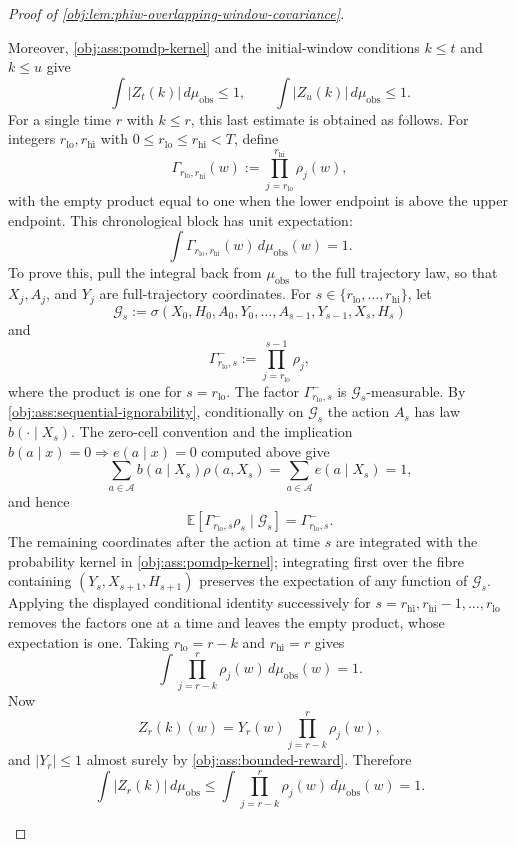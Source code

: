\documentclass[11pt]{article}
\begin{document}
\begin{proof}[Proof of \cref{obj:lem:phiw-overlapping-window-covariance}]
\begin{enumerate}
Moreover, \cref{obj:ass:pomdp-kernel} and the initial-window conditions \(k\le t\) and \(k\le u\) give
\[
\int |Z_t(k)|\,d\mu_{\mathrm{obs}}\le 1,
\qquad
\int |Z_u(k)|\,d\mu_{\mathrm{obs}}\le 1 .
\]
For a single time \(r\) with \(k\le r\), this last estimate is obtained as follows. For integers \(r_{\mathrm{lo}},r_{\mathrm{hi}}\) with \(0\le r_{\mathrm{lo}}\le r_{\mathrm{hi}}<T\), define
\[
\Gamma_{r_{\mathrm{lo}},r_{\mathrm{hi}}}(w)
:=
\prod_{j=r_{\mathrm{lo}}}^{r_{\mathrm{hi}}}\rho_j(w),
\]
with the empty product equal to one when the lower endpoint is above the upper endpoint. This chronological block has unit expectation:
\[
\int \Gamma_{r_{\mathrm{lo}},r_{\mathrm{hi}}}(w)\,d\mu_{\mathrm{obs}}(w)=1 .
\]
To prove this, pull the integral back from \(\mu_{\mathrm{obs}}\) to the full trajectory law, so that \(X_j,A_j\), and \(Y_j\) are full-trajectory coordinates. For \(s\in\{r_{\mathrm{lo}},\ldots,r_{\mathrm{hi}}\}\), let
\[
\mathscr G_s
:=
\sigma(X_0,H_0,A_0,Y_0,\ldots,A_{s-1},Y_{s-1},X_s,H_s)
\]
and
\[
\Gamma^-_{r_{\mathrm{lo}},s}
:=
\prod_{j=r_{\mathrm{lo}}}^{s-1}\rho_j,
\]
where the product is one for \(s=r_{\mathrm{lo}}\). The factor \(\Gamma^-_{r_{\mathrm{lo}},s}\) is \(\mathscr G_s\)-measurable. By \cref{obj:ass:sequential-ignorability}, conditionally on \(\mathscr G_s\) the action \(A_s\) has law \(b(\cdot\mid X_s)\). The zero-cell convention and the implication \(b(a\mid x)=0\Rightarrow e(a\mid x)=0\) computed above give
\[
\sum_{a\in\mathcal A} b(a\mid X_s)\rho(a,X_s)
=
\sum_{a\in\mathcal A} e(a\mid X_s)
=
1,
\]
and hence
\[
\mathbb E\!\left[
\Gamma^-_{r_{\mathrm{lo}},s}\rho_s
\mid \mathscr G_s
\right]
=
\Gamma^-_{r_{\mathrm{lo}},s} .
\]
The remaining coordinates after the action at time \(s\) are integrated with the probability kernel in \cref{obj:ass:pomdp-kernel}; integrating first over the fibre containing \((Y_s,X_{s+1},H_{s+1})\) preserves the expectation of any function of \(\mathscr G_s\). Applying the displayed conditional identity successively for \(s=r_{\mathrm{hi}},r_{\mathrm{hi}}-1,\ldots,r_{\mathrm{lo}}\) removes the factors one at a time and leaves the empty product, whose expectation is one. Taking \(r_{\mathrm{lo}}=r-k\) and \(r_{\mathrm{hi}}=r\) gives
\[
\int \prod_{j=r-k}^{r}\rho_j(w)\,d\mu_{\mathrm{obs}}(w)=1 .
\]
Now
\[
Z_r(k)(w)
=
Y_r(w)\prod_{j=r-k}^{r}\rho_j(w),
\]
and \(|Y_r|\le 1\) almost surely by \cref{obj:ass:bounded-reward}. Therefore
\[
\int |Z_r(k)|\,d\mu_{\mathrm{obs}}
\le
\int \prod_{j=r-k}^{r}\rho_j(w)\,d\mu_{\mathrm{obs}}(w)
=
1 .
\]


\end{enumerate}
\end{proof}
\end{document}
